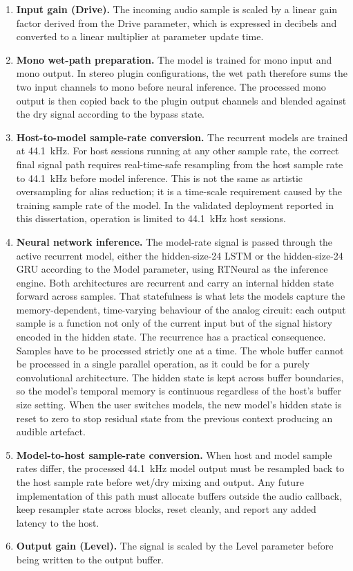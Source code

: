 \begin{enumerate}
  \item \textbf{Input gain (Drive).} The incoming audio sample is scaled by a linear gain factor derived from the Drive parameter, which is expressed in decibels and converted to a linear multiplier at parameter update time.

  \item \textbf{Mono wet-path preparation.} The model is trained for mono input and mono output. In stereo plugin configurations, the wet path therefore sums the two input channels to mono before neural inference. The processed mono output is then copied back to the plugin output channels and blended against the dry signal according to the bypass state.

  \item \textbf{Host-to-model sample-rate conversion.} The recurrent models are trained at 44.1~kHz. For host sessions running at any other sample rate, the correct final signal path requires real-time-safe resampling from the host sample rate to 44.1~kHz before model inference. This is not the same as artistic oversampling for alias reduction; it is a time-scale requirement caused by the training sample rate of the model. In the validated deployment reported in this dissertation, operation is limited to 44.1~kHz host sessions.

  \item \textbf{Neural network inference.} The model-rate signal is passed through the active recurrent model, either the hidden-size-24 LSTM or the hidden-size-24 GRU according to the Model parameter, using RTNeural as the inference engine. Both architectures are recurrent and carry an internal hidden state forward across samples. That statefulness is what lets the models capture the memory-dependent, time-varying behaviour of the analog circuit: each output sample is a function not only of the current input but of the signal history encoded in the hidden state. The recurrence has a practical consequence. Samples have to be processed strictly one at a time. The whole buffer cannot be processed in a single parallel operation, as it could be for a purely convolutional architecture. The hidden state is kept across buffer boundaries, so the model's temporal memory is continuous regardless of the host's buffer size setting. When the user switches models, the new model's hidden state is reset to zero to stop residual state from the previous context producing an audible artefact.

  \item \textbf{Model-to-host sample-rate conversion.} When host and model sample rates differ, the processed 44.1~kHz model output must be resampled back to the host sample rate before wet/dry mixing and output. Any future implementation of this path must allocate buffers outside the audio callback, keep resampler state across blocks, reset cleanly, and report any added latency to the host.

  \item \textbf{Output gain (Level).} The signal is scaled by the Level parameter before being written to the output buffer.
\end{enumerate}


